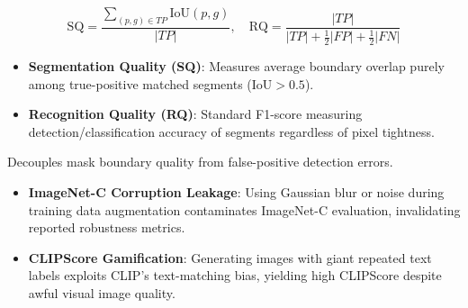 \begin{qa}
{$$\text{SQ} = \frac{\sum_{(p, g) \in TP} \text{IoU}(p, g)}{|TP|}, \quad \text{RQ} = \frac{|TP|}{|TP| + \frac{1}{2}|FP| + \frac{1}{2}|FN|}$$
\begin{itemize}[leftmargin=*,itemsep=0.8pt]
\item \textbf{Segmentation Quality (SQ)}: Measures average boundary overlap purely among true-positive matched segments ($\text{IoU} > 0.5$).
\item \textbf{Recognition Quality (RQ)}: Standard F1-score measuring detection/classification accuracy of segments regardless of pixel tightness.
\end{itemize}
Decouples mask boundary quality from false-positive detection errors.}
\end{qa}

\begin{trap}
\begin{itemize}
\item \textbf{ImageNet-C Corruption Leakage}: Using Gaussian blur or noise during training data augmentation contaminates ImageNet-C evaluation, invalidating reported robustness metrics.
\item \textbf{CLIPScore Gamification}: Generating images with giant repeated text labels exploits CLIP's text-matching bias, yielding high CLIPScore despite awful visual image quality.
\end{itemize}
\end{trap}
